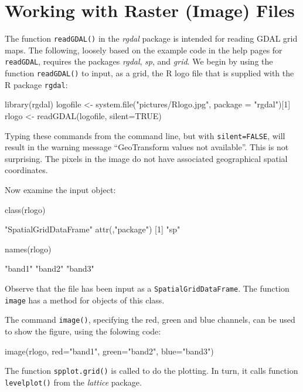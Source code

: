 \documentclass{tufte-book}\usepackage[]{graphicx}\usepackage[]{color}
\newcommand{\txtt}[1]{\texttt{#1}}
\begin{document}
\section{Working with Raster (Image) Files}
The function \txtt{readGDAL()} in the {\em rgdal} package is
intended for reading GDAL grid maps.
The following, loosely based on the example code in the help pages for
\txtt{readGDAL}, requires the packages {\em rgdal}, {\em sp}, and
       {\em grid}.  We begin by using the function \txtt{readGDAL()}
to input, as a grid, the R logo file that is supplied with the
R package \txtt{rgdal}:
\begin{Schunk}
\begin{Sinput}
library(rgdal)
logofile <- system.file("pictures/Rlogo.jpg",
                        package = "rgdal")[1]
rlogo <- readGDAL(logofile, silent=TRUE)
\end{Sinput}
\end{Schunk}
Typing these commands from the command line, but with
\txtt{silent=FALSE}, will result in the warning message ``GeoTransform
values not available''.  This is not surprising.  The pixels in the
image do not have associated geographical spatial coordinates.

Now examine the input object:
\begin{Schunk}
\begin{Sinput}
class(rlogo)
\end{Sinput}
\begin{Soutput}
[1] "SpatialGridDataFrame"
attr(,"package")
[1] "sp"
\end{Soutput}
\begin{Sinput}
names(rlogo)
\end{Sinput}
\begin{Soutput}
[1] "band1" "band2" "band3"
\end{Soutput}
\end{Schunk}
\noindent
Observe that the file has been input as a \txtt{SpatialGridDataFrame}. The
function \txtt{image} has a method for objects of this class.

The command \txtt{image()}, specifying the red, green and blue channels,
can be used to show the figure, using the folowing code:

\begin{Schunk}
\begin{Sinput}
image(rlogo, red="band1",
      green="band2",
      blue="band3")
\end{Sinput}
\end{Schunk}
\noindent
The function \txtt{spplot.grid()} is called to do the plotting.
In turn, it calls function \txtt{levelplot()} from the
{\em lattice} package.
\end{document}
